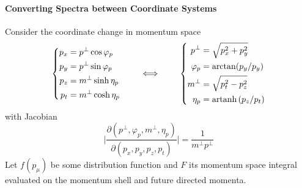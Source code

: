 \paragraph{Converting Spectra between Coordinate Systems}

Consider the coordinate change in momentum space
\begin{equation}
    \left\{
    \begin{split}
        p_x&=p^\perp\cos\varphi_p\\
        p_y&=p^\perp\sin\varphi_p\\
        p_z&=m^\perp\sinh\eta_p\\
        p_t&=m^\perp\cosh\eta_p
    \end{split}
    \right.\qquad\iff\qquad
    \left\{
    \begin{split}
        p^\perp&=\sqrt{p_x^2+p_y^2}\\
        \varphi_p&=\arctan(p_y/p_y)\\
        m^\perp&=\sqrt{p_t^2-p_z^2}\\
        \eta_p&={\text{artanh}\,}(p_z/p_t)
    \end{split}
    \right.
\end{equation}
with Jacobian
\begin{equation}
    \big\vert\frac{\partial(p^\perp,\varphi_p,m^\perp,\eta_p)}{\partial(p_x,p_y,p_z,p_t)}\big\vert=\frac{1}{m^\perp p^\perp}
\end{equation}
Let $f(p_\mu)$ be some distribution function and $F$ its momentum space integral evaluated on the momentum shell and future directed momenta.

